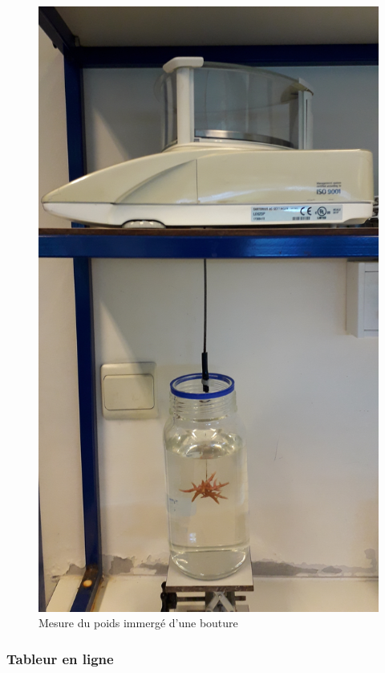 \documentclass[]{article}
\begin{document}
\begin{centering}
\begin{figure}[h!]
\includegraphics[angle=270]{../image/poster-balance.jpg}
\caption{Mesure du poids immergé d'une bouture}
\end{figure}
\end {centering}

\subsubsection{Tableur en ligne}\label{tableur-en-ligne}
\end{document}

